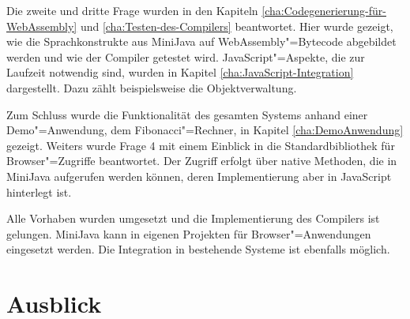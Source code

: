 Die zweite und dritte Frage wurden in den Kapiteln \ref{cha:Codegenerierung-für-WebAssembly} und \ref{cha:Testen-des-Compilers} beantwortet. Hier wurde gezeigt, wie die Sprachkonstrukte aus MiniJava auf WebAssembly"=Bytecode abgebildet werden und wie der Compiler getestet wird. JavaScript"=Aspekte, die zur Laufzeit notwendig sind, wurden in Kapitel \ref{cha:JavaScript-Integration} dargestellt. Dazu zählt beispielsweise die Objektverwaltung.

Zum Schluss wurde die Funktionalität des gesamten Systems anhand einer Demo"=Anwendung, dem Fibonacci"=Rechner, in Kapitel \ref{cha:DemoAnwendung} gezeigt. Weiters wurde Frage 4 mit einem Einblick in die Standardbibliothek für Browser"=Zugriffe beantwortet. Der Zugriff erfolgt über native Methoden, die in MiniJava aufgerufen werden können, deren Implementierung aber in JavaScript hinterlegt ist.

Alle Vorhaben wurden umgesetzt und die Implementierung des Compilers ist gelungen. MiniJava kann in eigenen Projekten für Browser"=Anwendungen eingesetzt werden. Die Integration in bestehende Systeme ist ebenfalls möglich.

\section{Ausblick}

